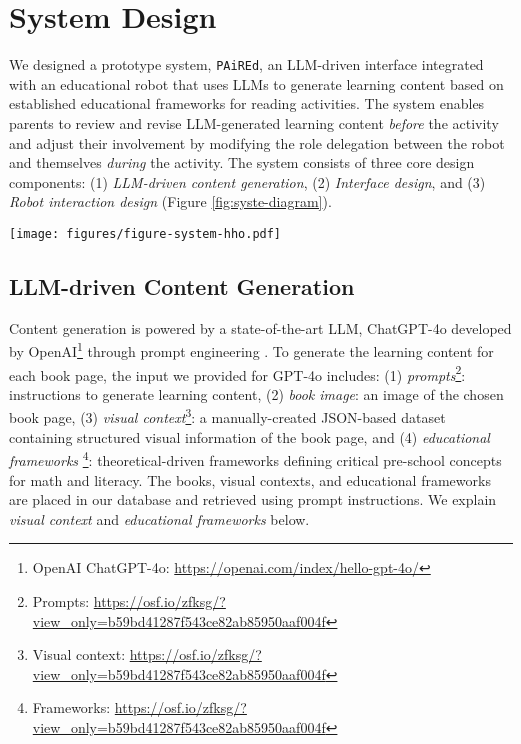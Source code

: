 \section{System Design} \label{sec-system}

We designed a prototype system, \texttt{PAiREd}, an LLM-driven interface integrated with an educational robot that uses LLMs to generate learning content based on established educational frameworks for reading activities. The system enables parents to review and revise LLM-generated learning content \textit{before} the activity and adjust their involvement by modifying the role delegation between the robot and themselves \textit{during} the activity. The system consists of three core design components: (1) \textit{LLM-driven content generation}, (2) \textit{Interface design}, and (3) \textit{Robot interaction design} (Figure \ref{fig:syste-diagram}).

\begin{figure*}[t!]
  \texttt{[image: figures/figure-system-hho.pdf]}
   \vspace{-6pt}
  \caption{\texttt{PAiREd} System Architecture Overview. The system consists of three key components: prompt instructions and data, the web application (which includes both the editor and activity interfaces), and the robot interaction module.}
  \label{fig:syste-diagram}
   \vspace{-10pt}
\end{figure*}

\subsection{LLM-driven Content Generation}
Content generation is powered by a state-of-the-art LLM, ChatGPT-4o \cite{achiam2023gpt} developed by OpenAI\footnote{OpenAI ChatGPT-4o: \url{https://openai.com/index/hello-gpt-4o/}} through prompt engineering \cite{sahoo2024systematic}. To generate the learning content for each book page, the input we provided for GPT-4o includes: (1) \textit{prompts}\footnote{Prompts: \url{https://osf.io/zfksg/?view_only=b59bd41287f543ce82ab85950aaf004f}}: instructions to generate learning content, (2) \textit{book image}: an image of the chosen book page, (3) \textit{visual context}\footnote{Visual context: \url{https://osf.io/zfksg/?view_only=b59bd41287f543ce82ab85950aaf004f}}: a manually-created JSON-based dataset containing structured visual information of the book page, and (4) \textit{educational frameworks} \footnote{Frameworks: \url{https://osf.io/zfksg/?view_only=b59bd41287f543ce82ab85950aaf004f}}: theoretical-driven frameworks defining critical pre-school concepts for math and literacy. The books, visual contexts, and educational frameworks are placed in our database and retrieved using prompt instructions. We explain \textit{visual context} and \textit{educational frameworks} below.

